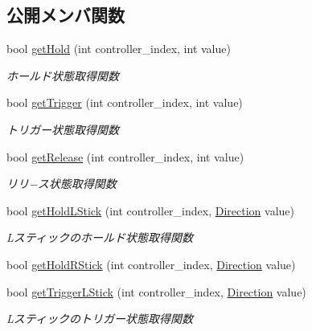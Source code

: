\subsection*{公開メンバ関数}
\begin{DoxyCompactItemize}
\item 
bool \mbox{\hyperlink{class_controller_a65e554b546455b9c1fdeb9e5d87731d0}{get\+Hold}} (int controller\+\_\+index, int value)
\begin{DoxyCompactList}\small\item\em ホールド状態取得関数 \end{DoxyCompactList}\item 
bool \mbox{\hyperlink{class_controller_afbd455b5ca62047004ab49a236e90014}{get\+Trigger}} (int controller\+\_\+index, int value)
\begin{DoxyCompactList}\small\item\em トリガー状態取得関数 \end{DoxyCompactList}\item 
bool \mbox{\hyperlink{class_controller_ae2fe11eda9a29429cda53f32eb8c1f1d}{get\+Release}} (int controller\+\_\+index, int value)
\begin{DoxyCompactList}\small\item\em リリ−ス状態取得関数 \end{DoxyCompactList}\item 
bool \mbox{\hyperlink{class_controller_a8bdb3ab0c7d74df02488df3e02fea6ff}{get\+Hold\+L\+Stick}} (int controller\+\_\+index, \mbox{\hyperlink{class_controller_a08e36bbdccc56ce55cdbd5dcc0f438d4}{Direction}} value)
\begin{DoxyCompactList}\small\item\em Lスティックのホールド状態取得関数 \end{DoxyCompactList}\item 
bool \mbox{\hyperlink{class_controller_a58759e8aa85b6f5bd19a8d3c9304580f}{get\+Hold\+R\+Stick}} (int controller\+\_\+index, \mbox{\hyperlink{class_controller_a08e36bbdccc56ce55cdbd5dcc0f438d4}{Direction}} value)
\item 
bool \mbox{\hyperlink{class_controller_a7dae1e696002c07c0200432d8c4c87ed}{get\+Trigger\+L\+Stick}} (int controller\+\_\+index, \mbox{\hyperlink{class_controller_a08e36bbdccc56ce55cdbd5dcc0f438d4}{Direction}} value)
\begin{DoxyCompactList}\small\item\em Lスティックのトリガー状態取得関数 \end{DoxyCompactList}\item 

\end{DoxyCompactItemize}

